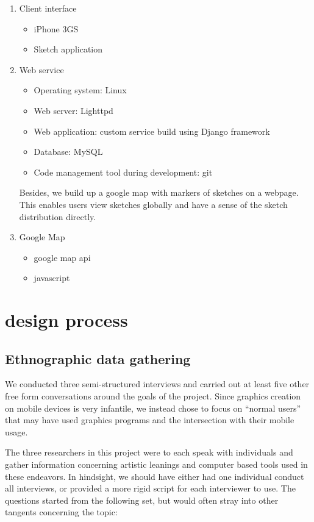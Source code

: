 \documentclass{chi2009}
\begin{document}
\begin{enumerate}
\item Client interface
        \begin{itemize}
        \item iPhone 3GS
        \item  Sketch application
        \end{itemize}

\item Web service
        \begin{itemize}
        \item Operating system: Linux
        \item Web server: Lighttpd
        \item Web application: custom service build using Django framework
        \item Database: MySQL
        \item Code management tool during development: git
        \end{itemize}


Besides, we build up a google map with markers of sketches on a webpage. This enables users view  sketches globally and have a sense of the sketch distribution directly.

\item Google Map
   \begin{itemize}
   \item google map api
   \item javascript
   \end{itemize}
   \end{enumerate}

\section{design process}

\subsection{Ethnographic data gathering}
We conducted three semi-structured interviews and carried out at least five
other free form conversations around the goals of the project.  Since graphics
creation on mobile devices is very infantile, we instead chose to focus on
``normal users'' that may have used graphics programs and the intersection with
their mobile usage.

The three researchers in this project were to each speak with individuals and
gather information concerning artistic leanings and computer based tools used
in these endeavors.  In hindsight, we should have either had one individual
conduct all interviews, or provided a more rigid script for each interviewer to
use.  The questions started from the following set, but would often stray into
other tangents concerning the topic:
\end{document}

